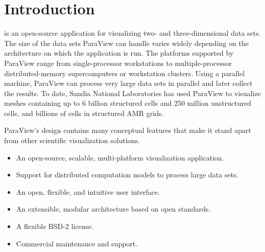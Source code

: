 \chapter{Introduction}
\label{chap:Introduction}

 is an open-source application for visualizing two- and
three-dimensional data sets.  The size of the data sets ParaView can handle
varies widely depending on the architecture on which the application is
run.  The platforms supported by ParaView range from single-processor
workstations to multiple-processor distributed-memory supercomputers or
workstation clusters.  Using a parallel machine, ParaView can process very
large data sets in parallel and later collect the results.  To date, Sandia
National Laboratories has used ParaView to visualize meshes containing up
to 6 billion structured cells and 250 million unstructured cells, and
billions of cells in structured AMR grids.

ParaView’s design contains many conceptual features that make it stand
apart from other scientific visualization solutions.

\begin{itemize}
\item An open-source, scalable, multi-platform visualization application.
\item Support for distributed computation models to process large data sets.
\item An open, flexible, and intuitive user interface.
\item An extensible, modular architecture based on open standards.
\item A flexible BSD-2 license.
\item Commercial maintenance and support.
\end{itemize}


